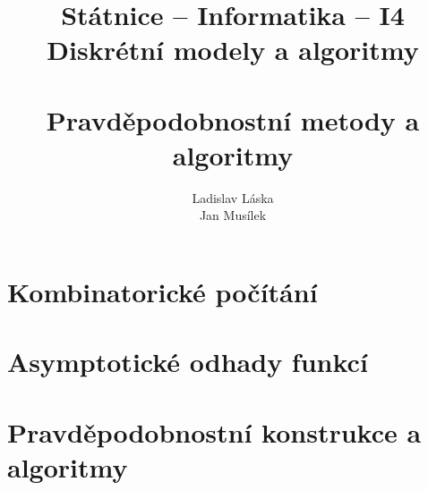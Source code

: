 \documentclass[a4paper,12pt,titlepage]{article}
\title{Státnice -- Informatika -- I4\\ Diskrétní modely a algoritmy\\ ~\\ 
Pravděpodobnostní metody a algoritmy}
\author{Ladislav Láska\\ Jan Musílek}
\begin{document}
\maketitle
\newpage
\tableofcontents
\newpage

\section{Kombinatorické počítání}



\section{Asymptotické odhady funkcí}
\section{Pravděpodobnostní konstrukce a algoritmy}

\end{document}
